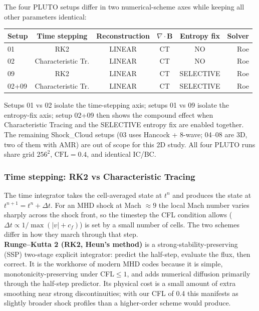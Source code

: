 \documentclass[11pt,a4paper]{article}
\begin{document}
The four PLUTO setups differ in two numerical-scheme axes while keeping all other parameters identical:

\medskip
\begin{center}
\begin{tabular}{lccccr}
\toprule Setup & Time stepping & Reconstruction & $\nabla\!\cdot\!\mathbf{B}$ & Entropy fix & Solver \\ \midrule
01    & RK2                  & LINEAR & CT   & NO         & Roe \\
02    & Characteristic Tr.  & LINEAR & CT   & NO         & Roe \\
09    & RK2                  & LINEAR & CT   & SELECTIVE  & Roe \\
02+09 & Characteristic Tr.  & LINEAR & CT   & SELECTIVE  & Roe \\ \bottomrule
\end{tabular}
\end{center}
\medskip


Setups 01 vs 02 isolate the time-stepping axis; setups 01 vs 09 isolate the entropy-fix axis; setup 02+09 then shows the compound effect when Characteristic Tracing and the SELECTIVE entropy fix are enabled together. 
\\

The remaining Shock\_Cloud setups (03 uses Hancock + 8-wave; 04--08 are 3D, two of them with AMR) are out of scope for this 2D study. All four PLUTO runs share grid $256^2$, $\mathrm{CFL}=0.4$, and identical IC/BC.

\subsubsection{Time stepping: RK2 vs Characteristic Tracing}

The time integrator takes the cell-averaged state at $t^n$ and produces the state at $t^{n+1} = t^n + \Delta t$. For an MHD shock at Mach $\approx 9$ the local Mach number varies sharply across the shock front, so the timestep the CFL condition allows ($\Delta t \propto 1 / \max(|v| + c_f)$) is set by a small number of cells. The two schemes differ in how they march through that step.
\\

\textbf{Runge--Kutta 2 (RK2, Heun's method)} is a strong-stability-preserving (SSP) two-stage explicit integrator: predict the half-step, evaluate the flux, then correct. It is the workhorse of modern MHD codes because it is simple, monotonicity-preserving under CFL$\le 1$, and adds numerical diffusion primarily through the half-step predictor. Its physical cost is a small amount of extra smoothing near strong discontinuities; with our CFL of 0.4 this manifests as slightly broader shock profiles than a higher-order scheme would produce.
\\
\end{document}

